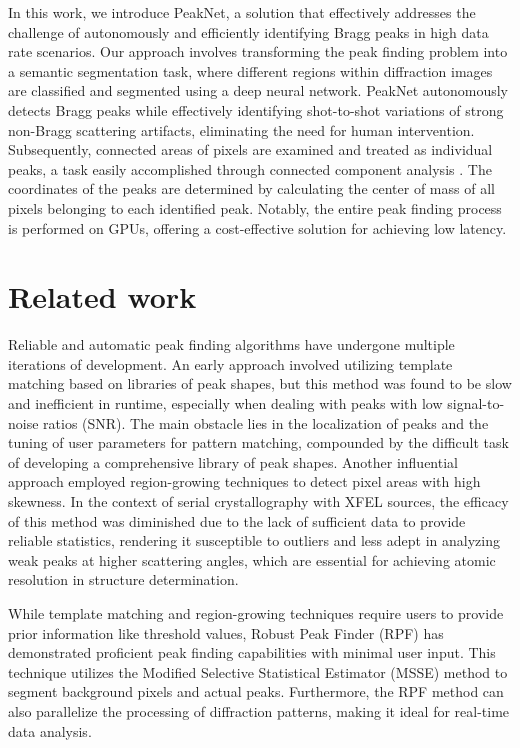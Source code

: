 \documentclass[a4paper]{article}
\newcommand{\peaknet}{PeakNet}
\begin{document}
In this work, we introduce \peaknet{}, a solution that effectively addresses the challenge of autonomously and efficiently identifying Bragg peaks in high data rate scenarios.  Our approach involves transforming the peak finding problem into a semantic segmentation task, where different regions within diffraction images are classified and segmented using a deep neural network. \peaknet{} autonomously detects Bragg peaks while effectively identifying shot-to-shot variations of strong non-Bragg scattering artifacts, eliminating the need for human intervention.  Subsequently, connected areas of pixels are examined and treated as individual peaks, a task easily accomplished through connected component analysis \citep{weaverCentrosymmetricCrossSymmetricMatrices1985}.  The coordinates of the peaks are determined by calculating the center of mass of all pixels belonging to each identified peak.  Notably, the entire peak finding process is performed on GPUs, offering a cost-effective solution for achieving low latency.


\section{Related work}

Reliable and automatic peak finding algorithms have undergone multiple iterations of development.  An early approach involved utilizing template matching \citep{wilkinsonIntegrationSinglecrystalReflections1988a} based on libraries of peak shapes, but this method was found to be slow and inefficient in runtime, especially when dealing with peaks with low signal-to-noise ratios (SNR).  The main obstacle lies in the localization of peaks and the tuning of user parameters for pattern matching, compounded by the difficult task of developing a comprehensive library of peak shapes.  Another influential approach employed region-growing techniques \citep{bolotovskySeedSkewnessMethodIntegration1995, bartyCheetahSoftwareHighthroughput2014} to detect pixel areas with high skewness.  In the context of serial crystallography with XFEL sources, the efficacy of this method was diminished due to the lack of sufficient data to provide reliable statistics, rendering it susceptible to outliers and less adept in analyzing weak peaks at higher scattering angles, which are essential for achieving atomic resolution in structure determination.

While template matching and region-growing techniques require users to provide prior information like threshold values, Robust Peak Finder (RPF) \citep{hadian-jaziPeakfindingAlgorithmBased2017, hadian-jaziDataReductionSerial2021} has demonstrated proficient peak finding capabilities with minimal user input.  This technique utilizes the Modified Selective Statistical Estimator (MSSE) method to segment background pixels and actual peaks.  Furthermore, the RPF method can also parallelize the processing of diffraction patterns, making it ideal for real-time data analysis.
\end{document}
